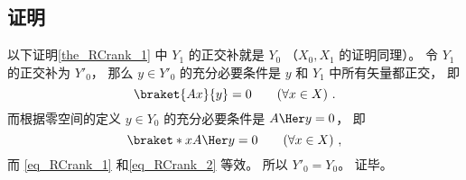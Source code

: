 \subsection{证明}
以下证明\autoref{the_RCrank_1} 中 $Y_1$ 的正交补就是 $Y_0$ （$X_0, X_1$ 的证明同理）。 令 $Y_1$ 的正交补为 $Y'_0$， 那么 $y \in Y'_0$ 的充分必要条件是 $y$ 和 $Y_1$ 中所有矢量都正交， 即
\begin{equation}\label{eq_RCrank_1}
\braket{Ax}{y} = 0 \qquad (\forall x \in X)~.
\end{equation}
而根据零空间的定义 $y \in Y_0$ 的充分必要条件是 $A\Her y = 0$， 即
\begin{equation}\label{eq_RCrank_2}
\braket*{x}{A\Her y} = 0 \qquad (\forall x \in X)~,
\end{equation}
而%
\autoref{eq_RCrank_1} 和\autoref{eq_RCrank_2} 等效。 所以 $Y'_0 = Y_0$。 证毕。
